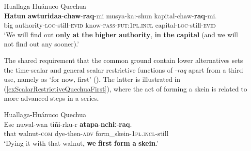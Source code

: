 \begin{exe}
	\ex Huallaga-Huánuco Quechua\label{exScalarRestrictiveQuechuaExtraordinary3}\\
	\gll \textbf{Hatun} \textbf{awturidaa}-\textbf{chaw}-\textbf{raq}-mi musya-ka:-shun kapital-chaw-\textbf{raq}-mi.\\
	big authority-\textsc{loc}-still-\textsc{evid} know-\textsc{pass}-\textsc{fut}:1\textsc{pl}.\textsc{incl} capital-\textsc{loc}-still-\textsc{evid}\\
	\glt \lq We will find out \textbf{only} \textbf{at} \textbf{the} \textbf{higher} \textbf{authority}, \textbf{in} \textbf{the} \textbf{capital} (and we will not find out any sooner).' \parencite[389]{Weber1989}	
\end{exe} 

The shared requirement that the common ground contain lower alternatives sets the time-scalar and general scalar restrictive functions of \mbox{-\textit{raq}} apart from a third use, namely as \lq for now, first' (). The latter is illustrated in (\ref{exScalarRestrictiveQuechuaFirst}), where the act of forming a skein is related to more advanced steps in a series.

\begin{exe}
	\ex Huallaga-Huánuco Quechua\label{exScalarRestrictiveQuechuaFirst}\\
	\gll Ese nuwal-wan tiñi-rku-r \textbf{atapa}-\textbf{nchiː}-\textbf{raq}.\\
	that walnut-\textsc{com} dye-then-\textsc{adv} form\_skein-1\textsc{pl}.\textsc{incl}-still\\
	\glt \lq Dying it with that walnut, \textbf{we} \textbf{first} \textbf{form} \textbf{a} \textbf{skein}.' \parencite[388]{Weber1989}
\end{exe}	

